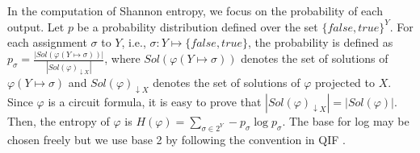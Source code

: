 \begin{comment}
	\begin{proposition}\label{projected-proposition}
		Given a circuit formula $\varphi$, the projected model counting of formula $\varphi$ under $X$ is equal to the number of models of formula $\varphi$, i.e. $ \left| \mathit{Sol}(\varphi)_{\downarrow X} \right| = \left| \mathit{Sol}(\varphi)  \right|$	
	\end{proposition}
	
	\begin{proof}
		Let $\sigma_{\downarrow X}$ represent the assignment of variables restricted to $X$.
		Since $\varphi$ is a circuit formula, each input uniquely corresponds to an output.
		If for each $\sigma_1, \sigma_2 \in \mathit{Sol}(\varphi)$, we have $\sigma_{1_{\downarrow X}} = \sigma_{2_{\downarrow X}} \Longrightarrow \sigma_{1_{\downarrow X}} = \sigma_{2_{\downarrow X}}$. 
		At the same time, we also know that $X \subseteq Vars(\varphi)$.
		So, we have $ \left| \mathit{Sol}(\varphi)_{\downarrow X} \right| = \left| \mathit{Sol}(\varphi)  \right|$
	\end{proof}
\end{comment}



    In the computation of Shannon entropy, we focus on the probability of each output.
	Let $p$ be a probability distribution defined over the set $\{ \mathit{false}, \mathit{true} \}^Y$.
	For each assignment $\sigma$ to $Y$, i.e., $\sigma:Y \mapsto \{ \mathit{false}, \mathit{true} \}$, the probability is defined as $p_{\sigma} = \frac{\left| \mathit{Sol}(\varphi(Y \mapsto \sigma)) \right|}{ \left| \mathit{Sol}(\varphi)_{\downarrow X} \right| }$, where $\mathit{Sol}(\varphi(Y \mapsto \sigma))$ denotes the set of solutions of $\varphi(Y \mapsto \sigma)$ and $\mathit{Sol}(\varphi)_{\downarrow X}$ denotes the set of solutions of $\varphi$ projected to $X$.
	Since $\varphi$ is a circuit formula, it is easy to prove that $ \left| \mathit{Sol}(\varphi)_{\downarrow X} \right| = \left| \mathit{Sol}(\varphi)  \right|$.
	Then, the entropy of $\varphi$ is $H(\varphi) = \sum_{\sigma \in 2^Y} -p_{\sigma} \log {p_{\sigma}}$.
	The base for log may be chosen freely but we use base 2 by following the convention in QIF \cite{smith2009foundations}.



